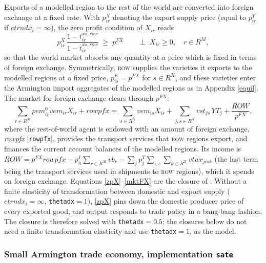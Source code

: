 Exports of a modelled region to the rest of the world are converted into foreign exchange at a fixed rate.
With $p^X_{ir}$ denoting the export supply price (equal to $p^Y_{ir}$ if $\textit{etrndx}_i=\infty$), the zero profit condition of $X_{ir}$ reads
\begin{equation}\label{zpX}
p^X_{ir}\,\frac{1-t^{xs,row}_{ir}}{1-\overline{t}^{xs,row}_{ir}} \;\geq\; p^{FX}
\qquad \perp \; X_{ir}\geq 0, \quad r\in R^M,
\end{equation}
so that the world market absorbs any quantity at a price which is fixed in terms of foreign exchange.
Symmetrically, \textsc{row} supplies the varieties it exports to the modelled regions at a fixed price, $p^E_{is}=p^{FX}$ for $s\in R^X$, and these varieties enter the Armington import aggregates of the modelled regions as in Appendix \ref{equil}.
The market for foreign exchange clears through $p^{FX}$:
\begin{equation}\label{mktFX}
\sum_{r\in R^M}\textit{pem}^0_{ir}\textit{vem}_{ir}X_{ir} + \textit{rowpfx}
= \sum_{s\in R^X}\textit{vem}_{is}X_{is} + \sum_{j,s\in R^X}\textit{vst}_{js}\,\textit{YT}_j
+ \frac{\textit{ROW}}{p^{FX}},
\end{equation}
where the rest-of-world agent is endowed with an amount of foreign exchange, \textit{rowpfx} [\texttt{rowpfx}], provides the transport services that \textsc{row} regions export, and finances the current account balances of the modelled regions.
Its income is $\textit{ROW}=p^{FX}\textit{rowpfx} - p^I_n\sum_{r\in R^M}\textit{vb}_r - \sum_j p^T_j\sum_{i,s}\sum_{k\in R^X}\textit{vtwr}_{jisk}$ (the last term being the transport services used in shipments to \textsc{row} regions), which it spends on foreign exchange.
Equations \eqref{zpX}--\eqref{mktFX} are the closure of \citet{LanzRutherford2016}.
Without a finite elasticity of transformation between domestic and export supply ($\textit{etrndx}_i=\infty$, \texttt{thetadx}$=1$), \eqref{zpX} pins down the domestic producer price of every exported good, and output responds to trade policy in a bang-bang fashion.
The \SOE closure is therefore solved with \texttt{thetadx}$=0.5$; the \SATE closures below do not need a finite transformation elasticity and use \texttt{thetadx}$=1$, as the \GMR model.

\subsubsection{Small Armington trade economy, implementation \texttt{sate}}

